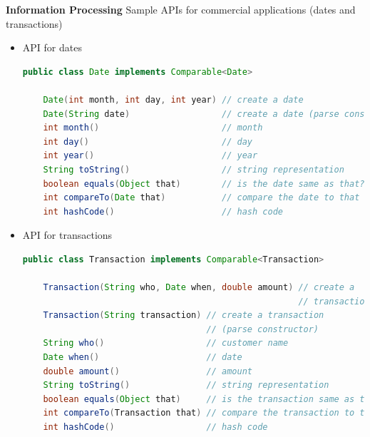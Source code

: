 \documentclass[8pt,a4paper,compress]{beamer}
\begin{document}
\begin{frame}[fragile]
\pause

\textbf{Information Processing} Sample APIs for commercial applications (dates and transactions)
\begin{itemize}
\pause

\item API for dates
\begin{lstlisting}[language=Java]
public class Date implements Comparable<Date>

    Date(int month, int day, int year) // create a date
    Date(String date)                  // create a date (parse constructor)
    int month()                        // month
    int day()                          // day
    int year()                         // year
    String toString()                  // string representation
    boolean equals(Object that)        // is the date same as that?
    int compareTo(Date that)           // compare the date to that
    int hashCode()                     // hash code
\end{lstlisting}

\pause

\item API for transactions
\begin{lstlisting}[language=Java]
public class Transaction implements Comparable<Transaction>

    Transaction(String who, Date when, double amount) // create a 
                                                      // transaction
    Transaction(String transaction) // create a transaction 
                                    // (parse constructor)
    String who()                    // customer name
    Date when()                     // date
    double amount()                 // amount
    String toString()               // string representation
    boolean equals(Object that)     // is the transaction same as that?
    int compareTo(Transaction that) // compare the transaction to that
    int hashCode()                  // hash code
\end{lstlisting}
\end{itemize}

\end{frame}
\end{document}
